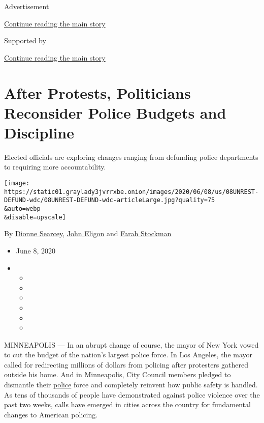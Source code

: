 Advertisement

\protect\hyperlink{after-top}{Continue reading the main story}

Supported by

\protect\hyperlink{after-sponsor}{Continue reading the main story}

\hypertarget{after-protests-politicians-reconsider-police-budgets-and-discipline}{%
\section{After Protests, Politicians Reconsider Police Budgets and
Discipline}\label{after-protests-politicians-reconsider-police-budgets-and-discipline}}

Elected officials are exploring changes ranging from defunding police
departments to requiring more accountability.

\texttt{[image: https://static01.graylady3jvrrxbe.onion/images/2020/06/08/us/08UNREST-DEFUND-wdc/08UNREST-DEFUND-wdc-articleLarge.jpg?quality=75\\\&auto=webp\\\&disable=upscale]}

By \href{https://www.nytimes3xbfgragh.onion/by/dionne-searcey}{Dionne
Searcey}, \href{https://www.nytimes3xbfgragh.onion/by/john-eligon}{John
Eligon} and
\href{https://www.nytimes3xbfgragh.onion/by/farah-stockman}{Farah
Stockman}

\begin{itemize}
\item
  June 8, 2020
\item
  \begin{itemize}
  \item
  \item
  \item
  \item
  \item
  \item
  \end{itemize}
\end{itemize}

MINNEAPOLIS --- In an abrupt change of course, the mayor of New York
vowed to cut the budget of the nation's largest police force. In Los
Angeles, the mayor called for redirecting millions of dollars from
policing after protesters gathered outside his home. And in Minneapolis,
City Council members pledged to dismantle their
\href{https://www.nytimes3xbfgragh.onion/2020/06/09/us/ca-defund-police.html}{police}
force and completely reinvent how public safety is handled. As tens of
thousands of people have demonstrated against police violence over the
past two weeks, calls have emerged in cities across the country for
fundamental changes to American policing.

